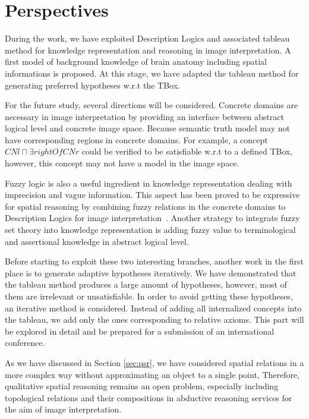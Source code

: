 \documentclass{article}
\begin{document}
\section{Perspectives}\label{sec:persp}
During the work, we have exploited Description Logics and associated tableau method for knowledge representation and reasoning in image interpretation.
A first model of background knowledge of brain anatomy  including spatial informations is proposed.  
At this stage, we have adapted the tableau method for generating preferred hypotheses w.r.t the TBox.

For the future study, several directions will be considered.
Concrete domains are necessary in image interpretation by providing an interface between abstract logical level and concrete image space.
Because semantic truth model may not have corresponding regions in concrete domains.
For example, a concept $CNl\sqcap \exists rightOf CNr$ could be verified to be satisfiable w.r.t to a defined TBox, however,
this concept may not have a model in the image space.

Fuzzy logic is also a useful ingredient in knowledge representation dealing with imprecision and vague information.
This aspect has been proved to be expressive for spatial reasoning by combining fuzzy relations in the concrete domains to Description Logics for image interpretation~\cite{hudelot2008spatial}.
Another strategy to integrate fuzzy set theory into knowledge representation is adding fuzzy value to terminological and assertional knowledge in abstract logical level.

Before starting to exploit these two interesting branches, another work in the first place is to generate adaptive hypotheses iteratively.
We have demonstrated that the tableau method produces a large amount of hypotheses, however, most of them are irrelevant or unsatisfiable.
In order to avoid getting these hypotheses, an iterative method is considered.
Instead of adding all internalized concepts into the tableau, we add only the ones corresponding to relative axioms.
This part will be explored in detail and be prepared for a submission of an international conference.

As we have discussed in Section \ref{sec:qsr}, we have considered spatial relations in a more complex way without approximating an object to a single point,
Therefore, qualitative spatial reasoning remains an open problem, especially including topological relations and their compositions in abductive reasoning services for the aim of image interpretation.
\end{document}
